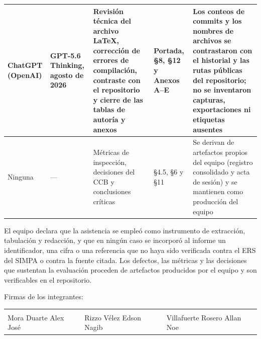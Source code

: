 \documentclass[11pt,letterpaper]{article}
\begin{document}
\begin{table}[H]
\begin{tabular}{L{2.5cm} L{1.8cm} L{3.5cm} L{2.9cm} L{2.9cm}}
\midrule
ChatGPT (OpenAI) & GPT-5.6 Thinking, agosto de 2026 & Revisión técnica del archivo \LaTeX{}, corrección de errores de compilación, contraste con el repositorio y cierre de las tablas de autoría y anexos & Portada, \S8, \S12 y Anexos A--E & Los conteos de commits y los nombres de archivos se contrastaron con el historial y las rutas públicas del repositorio; no se inventaron capturas, exportaciones ni etiquetas ausentes\\
\midrule
Ninguna & --- & Métricas de inspección, decisiones del CCB y conclusiones críticas & \S4.5, \S6 y \S11 & Se derivan de artefactos propios del equipo (registro consolidado y acta de sesión) y se mantienen como producción del equipo\\
\bottomrule
\end{tabular}
\end{table}

\noindent\small
El equipo declara que la asistencia se empleó como instrumento de extracción, tabulación y
redacción, y que en ningún caso se incorporó al informe un identificador, una cifra o una referencia
que no haya sido verificada contra el ERS del SIMPA o contra la fuente citada. Los defectos, las
métricas y las decisiones que sustentan la evaluación proceden de artefactos producidos por el
equipo y son verificables en el repositorio.\normalsize

\vspace{1cm}
\noindent Firmas de los integrantes:\\[1.5cm]
\noindent\begin{tabular}{p{4.8cm} p{4.8cm} p{4.8cm}}
\hrulefill & \hrulefill & \hrulefill\\
Mora Duarte Alex José & Rizzo Vélez Edson Nagib & Villafuerte Rosero Allan Noe\\
\end{tabular}
\end{document}
